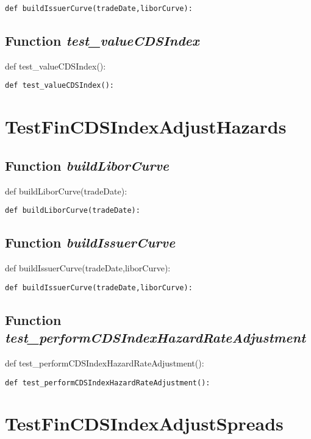 \documentclass[twoside,11pt]{book}
\begin{document}
\begin{lstlisting}
def buildIssuerCurve(tradeDate,liborCurve):
\end{lstlisting}

\subsection{Function {\it test\_valueCDSIndex}}
def test\_valueCDSIndex():

\begin{lstlisting}
def test_valueCDSIndex():
\end{lstlisting}


\newpage
\section{TestFinCDSIndexAdjustHazards}

\subsection{Function {\it buildLiborCurve}}
def buildLiborCurve(tradeDate):

\begin{lstlisting}
def buildLiborCurve(tradeDate):
\end{lstlisting}

\subsection{Function {\it buildIssuerCurve}}
def buildIssuerCurve(tradeDate,liborCurve):

\begin{lstlisting}
def buildIssuerCurve(tradeDate,liborCurve):
\end{lstlisting}

\subsection{Function {\it test\_performCDSIndexHazardRateAdjustment}}
def test\_performCDSIndexHazardRateAdjustment():

\begin{lstlisting}
def test_performCDSIndexHazardRateAdjustment():
\end{lstlisting}


\newpage
\section{TestFinCDSIndexAdjustSpreads}
\end{document}
